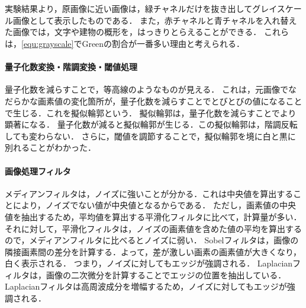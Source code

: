 \section{\consideration}
\paragraph{\kadaiaa}
実験結果より，原画像に近い画像は，緑チャネルだけを抜き出してグレイスケール画像として表示したものである．
また，赤チャネルと青チャネルを入れ替えた画像では，文字や建物の概形を，はっきりとらえることができる．
これらは，\eqref{equ:grayscale}でGreenの割合が一番多い理由と考えられる．
\paragraph{量子化数変換・階調変換・閾値処理}
量子化数を減らすことで，等高線のようなものが見える．
これは，元画像でなだらかな画素値の変化箇所が，量子化数を減らすことでとびとびの値になることで生じる．これを擬似輪郭という．
擬似輪郭は，量子化数を減らすことでより顕著になる．
量子化数が減ると擬似輪郭が生じる．この擬似輪郭は，階調反転しても変わらない．
さらに，閾値を調節することで，擬似輪郭を境に白と黒に別れることがわかった．
\paragraph{画像処理フィルタ}
メディアンフィルタは，ノイズに強いことが分かる．これは中央値を算出することにより，ノイズでない値が中央値となるからである．
ただし，画素値の中央値を抽出するため，平均値を算出する平滑化フィルタに比べて，計算量が多い．
それに対して，平滑化フィルタは，ノイズの画素値を含めた値の平均を算出するので，メディアンフィルタに比べるとノイズに弱い．
Sobelフィルタは，画像の隣接画素間の差分を計算する．よって，差が激しい画素の画素値が大きくなり，白く表示される．
つまり，ノイズに対してもエッジが強調される．
Laplacianフィルタは，画像の二次微分を計算することでエッジの位置を抽出している．Laplacianフィルタは高周波成分を増幅するため，ノイズに対してもエッジが強調される．

